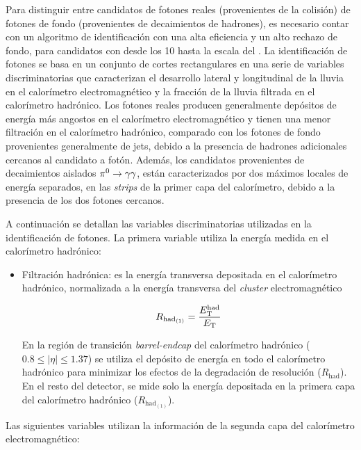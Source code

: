 Para distinguir entre candidatos de fotones reales (provenientes de la colisión) de fotones de fondo
(provenientes de decaimientos de hadrones), es
necesario contar con un algoritmo de identificación con una alta eficiencia y un alto rechazo
de fondo, para candidatos con {\et} desde los 10 {\gev} hasta la escala del
{\tev}. La identificación de fotones se basa en un conjunto de cortes
rectangulares en una serie de variables discriminatorias
que caracterizan el desarrollo lateral y longitudinal de la
lluvia en el calorímetro electromagnético y la fracción de la lluvia filtrada en
el calorímetro hadrónico. Los fotones reales producen generalmente depósitos de
energía más angostos en el calorímetro electromagnético y tienen una menor
filtración en el calorímetro hadrónico, comparado con los fotones de fondo
provenientes generalmente de jets, debido a la presencia de hadrones adicionales cercanos al
candidato a fotón. Además, los candidatos provenientes de
decaimientos aislados $\pi^0 \to \gam\gam$, están caracterizados por dos máximos
locales de energía separados, en las \emph{strips} de la primer capa del calorímetro,
debido a la presencia de los dos fotones cercanos.

A continuación se detallan las variables discriminatorias utilizadas en la
identificación de fotones. La primera variable utiliza la energía medida en el
calorímetro hadrónico:

\begin{itemize}\itemsep0.2cm\parskip0.2cm

\item Filtración hadrónica: es la energía transversa depositada en el
  calorímetro hadrónico, normalizada a la energía transversa del \emph{cluster}
  electromagnético

  \begin{equation}
    R_{\mathrm{had}_{(1)}} = \frac{E_{\mathrm{T}}^{\mathrm{had}}}{E_{\mathrm{T}}}
  \end{equation}

  En la región de transición \emph{barrel-endcap} del calorímetro hadrónico ($0.8\leq |\eta| \leq 1.37$) se utiliza
  el depósito de energía en todo el calorímetro hadrónico para minimizar los efectos de la
  degradación de resolución ($R_{\mathrm{had}}$). En el resto del detector, se mide solo la
  energía depositada en la primera capa del calorímetro hadrónico ($R_{\mathrm{had}_{(1)}}$).
\end{itemize}

Las siguientes variables utilizan la información de la segunda capa del calorímetro
electromagnético:

